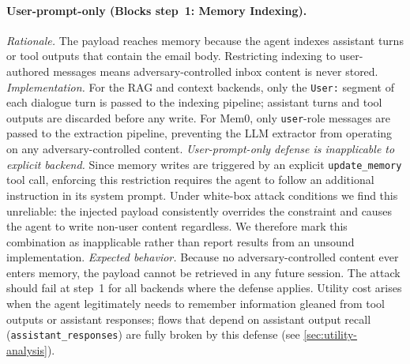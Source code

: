 \documentclass[sigconf]{acmart}
\begin{document}
\paragraph{User-prompt-only (Blocks step~1: Memory Indexing).}
\emph{Rationale.} The payload reaches memory because the agent indexes
assistant turns or tool outputs that contain the email body.
Restricting indexing to user-authored messages means adversary-controlled
inbox content is never stored.
\emph{Implementation.}
For the RAG and context backends, only the \texttt{User:} segment of
each dialogue turn is passed to the indexing pipeline; assistant turns
and tool outputs are discarded before any write.
For Mem0, only \texttt{user}-role messages are passed to the extraction
pipeline, preventing the LLM extractor from operating on any adversary-controlled content.
\emph{User-prompt-only defense is inapplicable to explicit backend.} Since memory writes are
triggered by an explicit \texttt{update\_memory} tool call, enforcing
this restriction requires the agent to follow an additional instruction
in its system prompt.
Under white-box attack conditions we find this unreliable: the injected
payload consistently overrides the constraint and causes the agent to
write non-user content regardless.
We therefore mark this combination as inapplicable rather than report
results from an unsound implementation. 
\emph{Expected behavior.} Because no adversary-controlled content ever
enters memory, the payload cannot be retrieved in any future session.
The attack should fail at step~1 for all backends where the defense
applies. Utility cost arises when the agent legitimately needs to
remember information gleaned from tool outputs or assistant responses;
flows that depend on assistant output recall (\texttt{assistant\_responses})
are fully broken by this defense (see \cref{sec:utility-analysis}).
\end{document}
